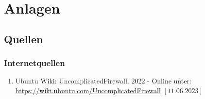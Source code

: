 \documentclass[a4paper, 11pt]{scrartcl}
\begin{document}
\newpage
\section{Anlagen}




\subsection{Quellen}\label{ch:src}
\subsubsection{Internetquellen}\label{ch:src_internet}
\begin{enumerate}
    \item Ubuntu Wiki: UncomplicatedFirewall. 2022 - Online unter: \newline\url{https://wiki.ubuntu.com/UncomplicatedFirewall} $\left[\text{11.06.2023}\right]$\label{src:ufw}
\end{enumerate}
\begin{small}

\end{small}
\end{document}
